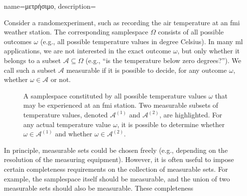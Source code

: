 {name={\foreignlanguage{greek}{μετρήσιμο}}, 
	description={Consider a \gls{randomexperiment}, such as recording 
		the air temperature at an \gls{fmi} weather station. The corresponding \gls{samplespace} $\Omega$ 
		consists of all possible outcomes $\omega$ (e.g., all possible temperature values in degree Celsius). 
		In many \gls{ml} applications, we are not interested in the exact outcome $\omega$, but only whether 
		it belongs to a subset $\mathcal{A} \subseteq \Omega$ (e.g., “is the temperature below zero degrees?”). 
		We call such a subset $\mathcal{A}$ measurable if it is possible to decide, for any outcome $\omega$, 
		whether $\omega \in \mathcal{A}$ or not. 
		\begin{figure}[H]
		\begin{center}
			\vspace*{10mm}
			\end{center}
		\caption{A \gls{samplespace} constituted by all possible temperature values $\omega$ 
			that may be experienced at an \gls{fmi} station. Two measurable subsets of temperature 
			values, denoted $\mathcal{A}^{(1)}$ and $\mathcal{A}^{(2)}$, are highlighted. For any 
			actual temperature value $\omega$, it is possible to determine whether $\omega \in \mathcal{A}^{(1)}$ 
			and whether $\omega \in \mathcal{A}^{(2)}$. } 
		\end{figure}
		In principle, measurable sets could be chosen freely (e.g., depending on the resolution of the 
		measuring equipment). However, it is often useful to impose certain completeness requirements 
		on the collection of measurable sets. For example, the \gls{samplespace} itself should be 
		measurable, and the union of two measurable sets should also be measurable. These completeness 
}}
